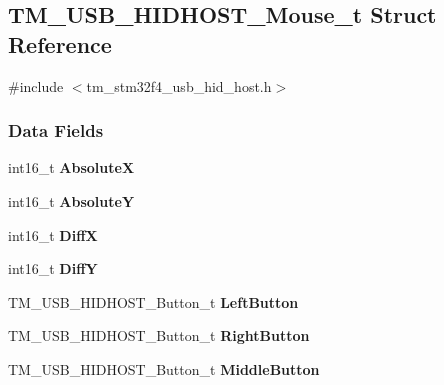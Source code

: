 \hypertarget{struct_t_m___u_s_b___h_i_d_h_o_s_t___mouse__t}{}\subsection{T\+M\+\_\+\+U\+S\+B\+\_\+\+H\+I\+D\+H\+O\+S\+T\+\_\+\+Mouse\+\_\+t Struct Reference}
\label{struct_t_m___u_s_b___h_i_d_h_o_s_t___mouse__t}


{\ttfamily \#include $<$tm\+\_\+stm32f4\+\_\+usb\+\_\+hid\+\_\+host.\+h$>$}

\subsubsection*{Data Fields}
\begin{DoxyCompactItemize}
\item 
\hypertarget{struct_t_m___u_s_b___h_i_d_h_o_s_t___mouse__t_ab6e26b91c9704cb92c8899f98e39d219}{}int16\+\_\+t {\bfseries Absolute\+X}\label{struct_t_m___u_s_b___h_i_d_h_o_s_t___mouse__t_ab6e26b91c9704cb92c8899f98e39d219}

\item 
\hypertarget{struct_t_m___u_s_b___h_i_d_h_o_s_t___mouse__t_a15e6cfbe29d8ce833b7b9e8d31a68fd0}{}int16\+\_\+t {\bfseries Absolute\+Y}\label{struct_t_m___u_s_b___h_i_d_h_o_s_t___mouse__t_a15e6cfbe29d8ce833b7b9e8d31a68fd0}

\item 
\hypertarget{struct_t_m___u_s_b___h_i_d_h_o_s_t___mouse__t_aa4fc7b9fbbe2a14ce4b84f9cc59ba20d}{}int16\+\_\+t {\bfseries Diff\+X}\label{struct_t_m___u_s_b___h_i_d_h_o_s_t___mouse__t_aa4fc7b9fbbe2a14ce4b84f9cc59ba20d}

\item 
\hypertarget{struct_t_m___u_s_b___h_i_d_h_o_s_t___mouse__t_a32d848feb1432d3b201b9b9e4203c5a5}{}int16\+\_\+t {\bfseries Diff\+Y}\label{struct_t_m___u_s_b___h_i_d_h_o_s_t___mouse__t_a32d848feb1432d3b201b9b9e4203c5a5}

\item 
\hypertarget{struct_t_m___u_s_b___h_i_d_h_o_s_t___mouse__t_aaaba1cd98a28975003645cb9ab2ee576}{}T\+M\+\_\+\+U\+S\+B\+\_\+\+H\+I\+D\+H\+O\+S\+T\+\_\+\+Button\+\_\+t {\bfseries Left\+Button}\label{struct_t_m___u_s_b___h_i_d_h_o_s_t___mouse__t_aaaba1cd98a28975003645cb9ab2ee576}

\item 
\hypertarget{struct_t_m___u_s_b___h_i_d_h_o_s_t___mouse__t_a8afa89a70914c3df4cdc339d026cab05}{}T\+M\+\_\+\+U\+S\+B\+\_\+\+H\+I\+D\+H\+O\+S\+T\+\_\+\+Button\+\_\+t {\bfseries Right\+Button}\label{struct_t_m___u_s_b___h_i_d_h_o_s_t___mouse__t_a8afa89a70914c3df4cdc339d026cab05}

\item 
\hypertarget{struct_t_m___u_s_b___h_i_d_h_o_s_t___mouse__t_a580a76a381380214cf12b0589fca6b4b}{}T\+M\+\_\+\+U\+S\+B\+\_\+\+H\+I\+D\+H\+O\+S\+T\+\_\+\+Button\+\_\+t {\bfseries Middle\+Button}\label{struct_t_m___u_s_b___h_i_d_h_o_s_t___mouse__t_a580a76a381380214cf12b0589fca6b4b}

\end{DoxyCompactItemize}


